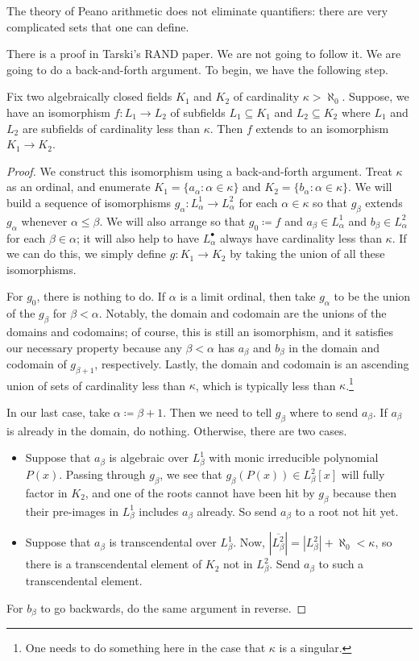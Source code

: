 \documentclass[../notes.tex]{subfiles}
\begin{document}
\begin{remark}
	The theory of Peano arithmetic does not eliminate quantifiers: there are very complicated sets that one can define.
\end{remark}
There is a proof in Tarski's RAND paper. We are not going to follow it. We are going to do a back-and-forth argument. To begin, we have the following step.
\begin{proposition}
	Fix two algebraically closed fields $K_1$ and $K_2$ of cardinality $\kappa>\aleph_0$. Suppose, we have an isomorphism $f\colon L_1\to L_2$ of subfields $L_1\subseteq K_1$ and $L_2\subseteq K_2$ where $L_1$ and $L_2$ are subfields of cardinality less than $\kappa$. Then $f$ extends to an isomorphism $K_1\to K_2$.
\end{proposition}
\begin{proof}
	We construct this isomorphism using a back-and-forth argument. Treat $\kappa$ as an ordinal, and enumerate $K_1=\{a_\alpha:\alpha\in\kappa\}$ and $K_2=\{b_\alpha:\alpha\in\kappa\}$. We will build a sequence of isomorphisms $g_\alpha\colon L^1_\alpha\to L^2_\alpha$ for each $\alpha\in\kappa$ so that $g_\beta$ extends $g_\alpha$ whenever $\alpha\le\beta$. We will also arrange so that $g_0\coloneqq f$ and $a_\beta\in L^1_\alpha$ and $b_\beta\in L^2_\alpha$ for each $\beta\in\alpha$; it will also help to have $L^\bullet_\alpha$ always have cardinality less than $\kappa$. If we can do this, we simply define $g\colon K_1\to K_2$ by taking the union of all these isomorphisms.

	For $g_0$, there is nothing to do. If $\alpha$ is a limit ordinal, then take $g_\alpha$ to be the union of the $g_\beta$ for $\beta<\alpha$. Notably, the domain and codomain are the unions of the domains and codomains; of course, this is still an isomorphism, and it satisfies our necessary property because any $\beta<\alpha$ has $a_\beta$ and $b_\beta$ in the domain and codomain of $g_{\beta+1}$, respectively. Lastly, the domain and codomain is an ascending union of sets of cardinality less than $\kappa$, which is typically less than $\kappa$.\footnote{One needs to do something here in the case that $\kappa$ is a singular.}

	In our last case, take $\alpha\coloneqq\beta+1$. Then we need to tell $g_\beta$ where to send $a_\beta$. If $a_\beta$ is already in the domain, do nothing. Otherwise, there are two cases.
	\begin{itemize}
		\item Suppose that $a_\beta$ is algebraic over $L^1_\beta$ with monic irreducible polynomial $P(x)$. Passing through $g_\beta$, we see that $g_\beta(P(x))\in L^2_\beta[x]$ will fully factor in $K_2$, and one of the roots cannot have been hit by $g_\beta$ because then their pre-images in $L^1_\beta$ includes $a_\beta$ already. So send $a_\beta$ to a root not hit yet.
		\item Suppose that $a_\beta$ is transcendental over $L^1_\beta$. Now, $\left|\overline{L^2_\beta}\right|=\left|L^2_\beta\right|+\aleph_0<\kappa$, so there is a transcendental element of $K_2$ not in $L^2_\beta$. Send $a_\beta$ to such a transcendental element.
	\end{itemize}
	For $b_\beta$ to go backwards, do the same argument in reverse.
\end{proof}
\end{document}
